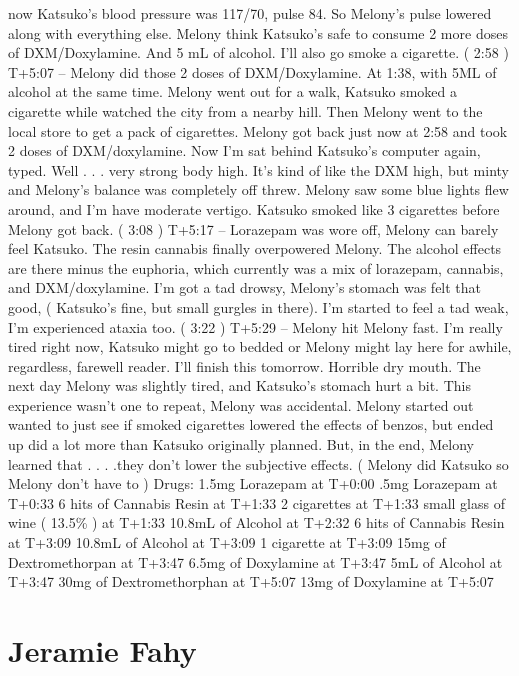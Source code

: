 \documentclass[12pt]{book}
\begin{document}
now Katsuko's blood pressure was 117/70, pulse 84. So Melony's pulse lowered along with everything else. Melony think Katsuko's safe to consume 2 more doses of DXM/Doxylamine. And 5 mL of alcohol. I'll also go smoke a cigarette. ( 2:58 ) T+5:07 -- Melony did those 2 doses of DXM/Doxylamine. At 1:38, with 5ML of alcohol at the same time. Melony went out for a walk, Katsuko smoked a cigarette while watched the city from a nearby hill. Then Melony went to the local store to get a pack of cigarettes. Melony got back just now at 2:58 and took 2 doses of DXM/doxylamine. Now I'm sat behind Katsuko's computer again, typed. Well . . .  very strong body high. It's kind of like the DXM high, but minty and Melony's balance was completely off threw. Melony saw some blue lights flew around, and I'm have moderate vertigo. Katsuko smoked like 3 cigarettes before Melony got back. ( 3:08 ) T+5:17 -- Lorazepam was wore off, Melony can barely feel Katsuko. The resin cannabis finally overpowered Melony. The alcohol effects are there minus the euphoria, which currently was a mix of lorazepam, cannabis, and DXM/doxylamine. I'm got a tad drowsy, Melony's stomach was felt that good, ( Katsuko's fine, but small gurgles in there). I'm started to feel a tad weak, I'm experienced ataxia too. ( 3:22 ) T+5:29 -- Melony hit Melony fast. I'm really tired right now, Katsuko might go to bedded or Melony might lay here for awhile, regardless, farewell reader. I'll finish this tomorrow. Horrible dry mouth. The next day Melony was slightly tired, and Katsuko's stomach hurt a bit. This experience wasn't one to repeat, Melony was accidental. Melony started out wanted to just see if smoked cigarettes lowered the effects of benzos, but ended up did a lot more than Katsuko originally planned. But, in the end, Melony learned that . . .  .they don't lower the subjective effects. ( Melony did Katsuko so Melony don't have to ) Drugs: 1.5mg Lorazepam at T+0:00 .5mg Lorazepam at T+0:33 6 hits of Cannabis Resin at T+1:33 2 cigarettes at T+1:33 small glass of wine ( 13.5\% ) at T+1:33 10.8mL of Alcohol at T+2:32 6 hits of Cannabis Resin at T+3:09 10.8mL of Alcohol at T+3:09 1 cigarette at T+3:09 15mg of Dextromethorpan at T+3:47 6.5mg of Doxylamine at T+3:47 5mL of Alcohol at T+3:47 30mg of Dextromethorphan at T+5:07 13mg of Doxylamine at T+5:07



\chapter{Jeramie Fahy}
\end{document}
